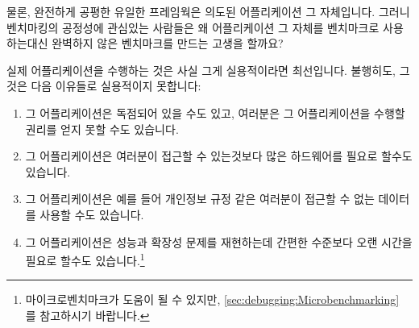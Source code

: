 물론, 완전하게 공평한 유일한 프레임웍은 의도된 어플리케이션 그 자체입니다.
그러니 벤치마킹의 공정성에 관심있는 사람들은 왜 어플리케이션 그 자체를
벤치마크로 사용하는대신 완벽하지 않은 벤치마크를 만드는 고생을 할까요?

실제 어플리케이션을 수행하는 것은 사실 그게 실용적이라면 최선입니다.
불행히도, 그것은 다음 이유들로 실용적이지 못합니다:

\begin{enumerate}
\item	그 어플리케이션은 독점되어 있을 수도 있고, 여러분은 그 어플리케이션을
	수행할 권리를 얻지 못할 수도 있습니다.
\item	그 어플리케이션은 여러분이 접근할 수 있는것보다 많은 하드웨어를 필요로
	할수도 있습니다.
\item	그 어플리케이션은 예를 들어 개인정보 규정 같은 여러분이 접근할 수 없는
	데이터를 사용할 수도 있습니다.
\item	그 어플리케이션은 성능과 확장성 문제를 재현하는데 간편한 수준보다 오랜
	시간을 필요로 할수도 있습니다.\footnote{
		마이크로벤치마크가 도움이 될 수 있지만,
		\cref{sec:debugging:Microbenchmarking} 를 참고하시기 바랍니다.}

\end{enumerate}

